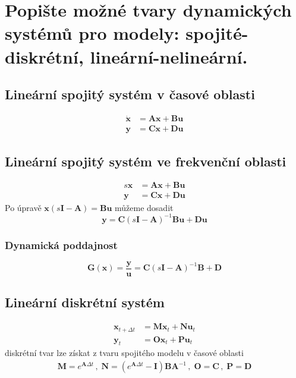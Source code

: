 \documentclass{article}
\begin{document}
	\section{Popište možné tvary dynamických systémů pro modely: spojité-diskrétní, lineární-nelineární. }
	
	\subsection*{Lineární spojitý systém v časové oblasti}
	\begin{align*}
		\bm{\dot{x}} &= \bm{A}\bm{x} + \bm{B}\bm{u} \\
		\bm{y} &= \bm{C}\bm{x} + \bm{D}\bm{u}
	\end{align*}
	\subsection*{Lineární spojitý systém ve frekvenční oblasti}
	\begin{align*}
		s\bm{x} &= \bm{A}\bm{x} + \bm{B}\bm{u} \\
		\bm{y} &= \bm{C}\bm{x} + \bm{D}\bm{u}
	\end{align*}
	Po úpravě $\bm{x}(s\bm{I} - \bm{A}) = \bm{B}\bm{u}$ můžeme dosadit
	\begin{equation}
		\bm{y} = \bm{C}(s\bm{I}-\bm{A})^{-1}\bm{B}\bm{u}+\bm{D}\bm{u}
	\end{equation}
	\subsubsection*{Dynamická poddajnost}
	\begin{equation}
	\bm{G}(\bm{x}) = \frac{\bm{y}}{\bm{u}} = \bm{C}(s\bm{I}-\bm{A})^{-1}\bm{B}+\bm{D}
	\end{equation}
	\subsection*{Lineární diskrétní systém}
	\begin{align*}
		\bm{x}_{t+\Delta t} &= \bm{M}\bm{x}_t + \bm{N}\bm{u}_t \\
		\bm{y}_t &= \bm{O}\bm{x}_t + \bm{P}\bm{u}_t
	\end{align*}
	diskrétní tvar lze získat z tvaru spojitého modelu v časové oblasti
	\begin{align*}
		\bm{M} = e^{\bm{A}\Delta t}
		\,,\;
		\bm{N} = \left( e^{\mathbf{A}\Delta t} - \mathbf{I} \right)\bm{B A}^{-1}
		\,,\;
		\bm{O} = \bm{C}
		\,,\;
		\bm{P} = \bm{D}
	\end{align*}
\end{document}
